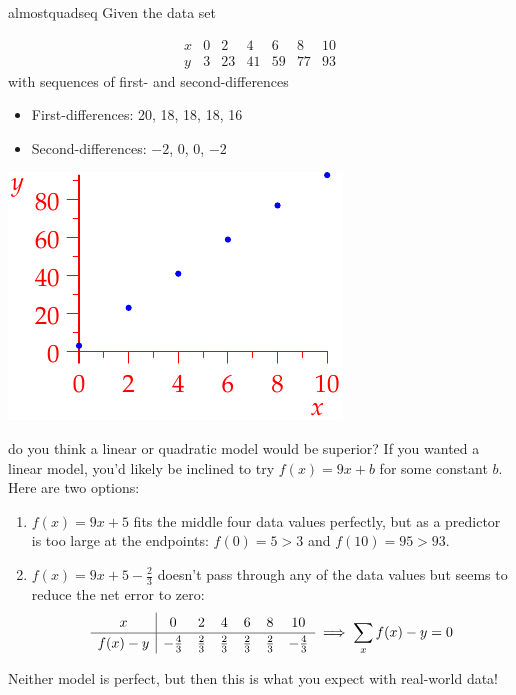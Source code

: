 \begin{example}{}{almostquadseq}
	Given the data set\par
	\begin{minipage}[t]{0.65\linewidth}\vspace{-10pt}
		\[
			\begin{array}{c|cccccc}
				x&0&2&4&6&8&10\\\hline
				y&3&23&41&59&77&93
			\end{array}
		\]
		with sequences of first- and second-differences
		\begin{itemize}
	  	\item[]First-differences: 20, 18, 18, 18, 16
	  	\item[]Second-differences: $-2$, 0, 0, $-2$ 
		\end{itemize}
	\end{minipage}
	\hfill
	\begin{minipage}[t]{0.34\linewidth}\vspace{-10pt}
		\flushright\includegraphics{seqquadex3}
	\end{minipage}\smallbreak
	do you think a linear or quadratic model would be superior?\smallbreak
	If you wanted a linear model, you'd likely be inclined to try $f(x)=9x+b$ for some constant $b$. Here are two options:
	\begin{enumerate}
	  \item $f(x)=9x+5$ fits the middle four data values perfectly, but as a predictor is too large at the endpoints: $f(0)=5>3$ and $f(10)=95>93$.
	  \item $f(x)=9x+5-\frac 23$ doesn't pass through any of the data values but seems to reduce the net error to zero:
	  \[
	  	\def\arraystretch{1.2}
	  	\begin{array}{c|cccccc}
				x&0&2&4&6&8&10\\\hline
				f(x)-y&-\frac 43&\frac 23&\frac 23&\frac 23&\frac 23&-\frac 43
			\end{array}
			\implies \sum_x f(x)-y=0
		\]
	\end{enumerate}
	Neither model is perfect, but then this is what you expect with real-world data!
\end{example}



